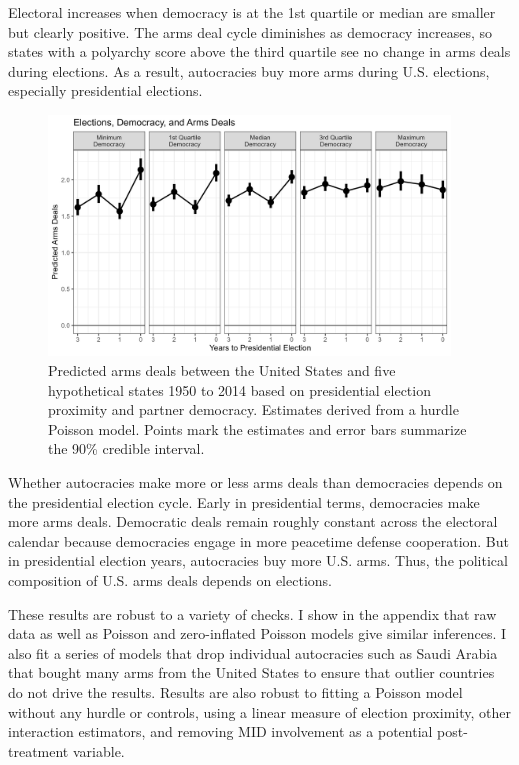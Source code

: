 \documentclass[12pt]{article}
\begin{document}
Electoral increases when democracy is at the 1st quartile or median are smaller but clearly positive.
The arms deal cycle diminishes as democracy increases, so states with a polyarchy score above the third quartile see no change in arms deals during elections.
As a result, autocracies buy more arms during U.S. elections, especially presidential elections.


\begin{figure}[htpb]
	\centering
		\includegraphics[width=0.95\textwidth]{../figures/democ-deals-pred.png}
	\caption{Predicted arms deals between the United States and five hypothetical states 1950 to 2014 based on presidential election proximity and partner democracy. Estimates derived from a hurdle Poisson model. Points mark the estimates and error bars summarize the 90\% credible interval.}
	\label{fig:democ-deals-pred}
\end{figure}


Whether autocracies make more or less arms deals than democracies depends on the presidential election cycle. 
Early in presidential terms, democracies make more arms deals. 
Democratic deals remain roughly constant across the electoral calendar because democracies engage in more peacetime defense cooperation. 
But in presidential election years, autocracies buy more U.S. arms. 
Thus, the political composition of U.S. arms deals depends on elections. 


These results are robust to a variety of checks. 
I show in the appendix that raw data as well as Poisson and zero-inflated Poisson models give similar inferences. 
I also fit a series of models that drop individual autocracies such as Saudi Arabia that bought many arms from the United States to ensure that outlier countries do not drive the results. 
Results are also robust to fitting a Poisson model without any hurdle or controls, using a linear measure of election proximity, other interaction estimators, and removing MID involvement as a potential post-treatment variable. 
\end{document}
